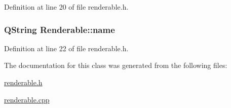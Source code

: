 Definition at line 20 of file renderable.\+h.

\hypertarget{class_renderable_a09b50e8371e55294da5a383475c53783}{}
\subsubsection[{name}]{\setlength{\rightskip}{0pt plus 5cm}Q\+String Renderable\+::name\hspace{0.3cm}{\ttfamily [protected]}}\label{class_renderable_a09b50e8371e55294da5a383475c53783}


Definition at line 22 of file renderable.\+h.



The documentation for this class was generated from the following files\+:\begin{DoxyCompactItemize}
\item 
\hyperlink{renderable_8h}{renderable.\+h}\item 
\hyperlink{renderable_8cpp}{renderable.\+cpp}\end{DoxyCompactItemize}
